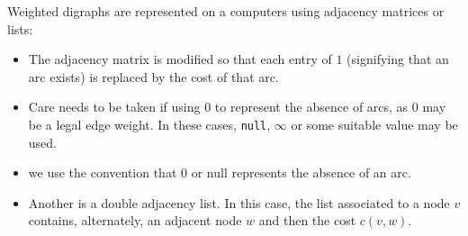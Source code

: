 Weighted digraphs are represented on a computers using adjacency matrices or lists:
\begin{itemize}
\item The adjacency matrix is modified so that
each entry of $1$ (signifying that an arc exists) is replaced by the
cost of that arc.
\item Care needs to be taken if using 0 to represent the absence of arcs, as 0 may be a legal edge weight. In these cases, \texttt{null}, $\infty$ or some suitable value may be used.
\item we use the convention that 0 or null represents the absence of an arc. 
\item Another is a double adjacency list. In this case, the
list associated to a node $v$ contains, alternately, an adjacent node
$w$ and then the cost $c(v, w)$.  
\end{itemize}



